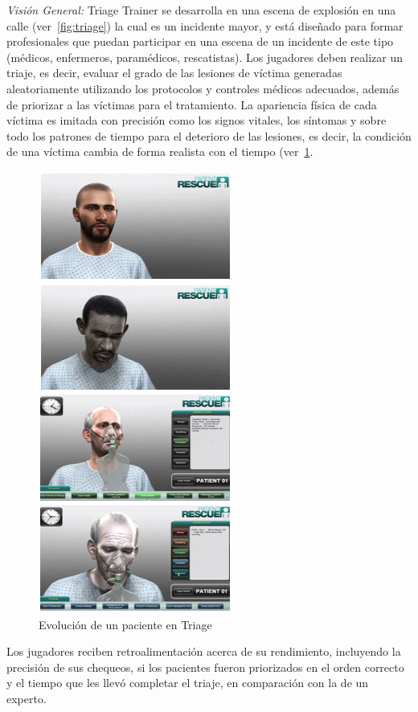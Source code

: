 \emph{Visión General: } Triage Trainer se desarrolla en una escena de explosión
en una calle (ver~\ref{fig:triage}) la cual es un incidente mayor, y está
diseñado para formar profesionales que puedan participar en una escena de un
incidente de este tipo (médicos, enfermeros, paramédicos, rescatistas). Los
jugadores deben realizar un triaje, es decir, evaluar el grado de las lesiones
de víctima generadas aleatoriamente utilizando los protocolos y controles
médicos adecuados, además de priorizar a las víctimas para el tratamiento. La
apariencia física de cada víctima es imitada con precisión como los signos
vitales, los síntomas y sobre todo los patrones de tiempo para el deterioro de
las lesiones, es decir, la condición de una víctima cambia de forma realista con
el tiempo (ver~\ref{fig:triage_patient1}.

\begin{figure}[h!]
	\centering 
	\includegraphics[scale=0.5]{tics/images/patient_side.jpg}
	\caption{Evolución de un paciente en Triage}
	\label{fig:triage_patient1}
\end{figure}

Los jugadores reciben retroalimentación acerca de su rendimiento, incluyendo la
precisión de sus chequeos, si los pacientes fueron priorizados en el orden
correcto y el tiempo que les llevó completar el triaje, en comparación con la de
un experto.

